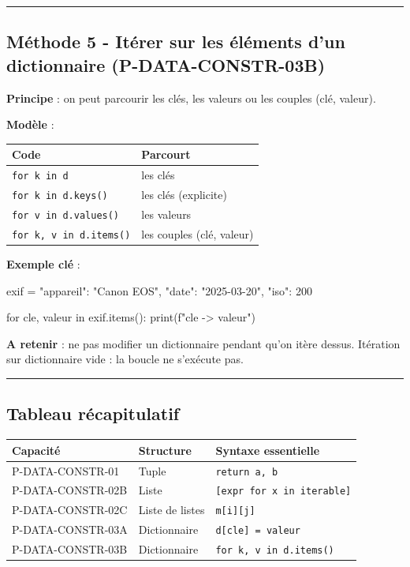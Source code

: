 \begin{center}\rule{0.5\linewidth}{0.5pt}\end{center}

\subsection{Méthode 5 - Itérer sur les éléments d’un dictionnaire (P-DATA-CONSTR-03B)}

\textbf{Principe} : on peut parcourir les clés, les valeurs ou les
couples (clé, valeur).

\textbf{Modèle} :

\begin{longtable}[]{@{}ll@{}}
\toprule\noalign{}
Code & Parcourt \\
\midrule\noalign{}
\endhead
\bottomrule\noalign{}
\endlastfoot
\texttt{for\ k\ in\ d} & les clés \\
\texttt{for\ k\ in\ d.keys()} & les clés (explicite) \\
\texttt{for\ v\ in\ d.values()} & les valeurs \\
\texttt{for\ k,\ v\ in\ d.items()} & les couples (clé, valeur) \\
\end{longtable}

\textbf{Exemple clé} :

\begin{python}
exif = {"appareil": "Canon EOS", "date": "2025-03-20", "iso": 200}

for cle, valeur in exif.items():
    print(f"{cle} -> {valeur}")
\end{python}

\textbf{A retenir} : ne pas modifier un dictionnaire pendant qu'on itère
dessus. Itération sur dictionnaire vide : la boucle ne s'exécute pas.

\begin{center}\rule{0.5\linewidth}{0.5pt}\end{center}

\subsection{Tableau récapitulatif}

\begin{longtable}[]{@{}lll@{}}
\toprule\noalign{}
Capacité & Structure & Syntaxe essentielle \\
\midrule\noalign{}
\endhead
\bottomrule\noalign{}
\endlastfoot
P-DATA-CONSTR-01 & Tuple & \texttt{return\ a,\ b} \\
P-DATA-CONSTR-02B & Liste & \texttt{{[}expr\ for\ x\ in\ iterable{]}} \\
P-DATA-CONSTR-02C & Liste de listes & \texttt{m{[}i{]}{[}j{]}} \\
P-DATA-CONSTR-03A & Dictionnaire & \texttt{d{[}cle{]}\ =\ valeur} \\
P-DATA-CONSTR-03B & Dictionnaire & \texttt{for\ k,\ v\ in\ d.items()} \\
\end{longtable}

